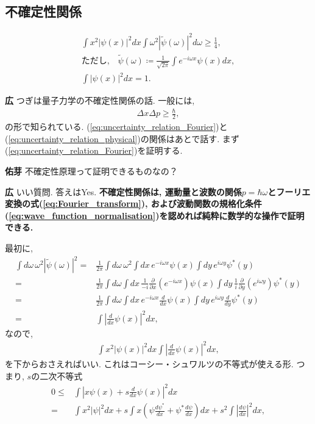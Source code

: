 \documentclass{ltjsarticle}
\theoremstyle{definition}
\newcommand{\parno}{\par\noindent}
\begin{document}
\subsection{不確定性関係}
\begin{tcolorbox}
  \begin{gather}
    \int x^2|\psi(x)|^2dx\int\omega^2|\tilde\psi(\omega)|^2d\omega\ge\frac14,\label{eq:uncertainty_relation_Fourier}\\
    \text{ただし,}\quad\tilde\psi(\omega)\coloneqq\frac1{\sqrt{2\pi}}\int e^{-i\omega x}\psi(x)dx,\label{eq:Fourier_transform}\\
    \int|\psi(x)|^2dx=1.\label{eq:wave_function_normalisation}
  \end{gather}
\end{tcolorbox}
\parno
\textbf{広} つぎは量子力学の不確定性関係の話. 一般には,
\begin{align}
  \Delta x\Delta p\ge\frac\hbar 2,\label{eq:uncertainty_relation_physical}
\end{align}
の形で知られている. (\ref{eq:uncertainty_relation_Fourier})と(\ref{eq:uncertainty_relation_physical})の関係はあとで話す. まず(\ref{eq:uncertainty_relation_Fourier})を証明する.
\parno
\textbf{佑芽} 不確定性原理って証明できるものなの？
\parno
\textbf{広} いい質問. 答えはYes. \textbf{不確定性関係は, 運動量と波数の関係$p=\hbar\omega$とフーリエ変換の式(\ref{eq:Fourier_transform}), および波動関数の規格化条件(\ref{eq:wave_function_normalisation})を認めれば純粋に数学的な操作で証明できる.}
\par
最初に,
\begin{align}
  \int d\omega\,\omega^2|\tilde\psi(\omega)|^2
  =&\frac1{2\pi}\int d\omega\,\omega^2\int dx\,e^{-i\omega x}\psi(x)\int dy\,e^{i\omega y}\psi^*(y)\\
  =&\frac1{2\pi}\int d\omega\int dx\,\frac1{-i}\frac\partial{\partial x}\left(e^{-i\omega x}\right)\psi(x)\int dy\,\frac1i\frac\partial{\partial y}\left(e^{i\omega y}\right)\psi^*(y)\\
  =&\frac1{2\pi}\int d\omega\int dx\,e^{-i\omega x}\frac d{dx}\psi(x)\int dy\,e^{i\omega y}\frac d{dy}\psi^*(y)\\
  =&\int\left|\frac d{dx}\psi(x)\right|^2dx,
\end{align}
なので,
\begin{align}
  \int x^2|\psi(x)|^2dx\int\left|\frac d{dx}\psi(x)\right|^2dx,
\end{align}
を下からおさえればいい. これはコーシー・シュワルツの不等式が使える形. つまり, $s$の二次不等式
\begin{align}
  0\le&\int\left|x\psi(x)+s\frac d{dx}\psi(x)\right|^2dx\\
  =&\int x^2|\psi|^2dx+s\int x\left(\psi\frac{d\psi^*}{dx}+\psi^*\frac{d\psi}{dx}\right)dx+s^2\int\left|\frac{d\psi}{dx}\right|^2dx,
\end{align}
\end{document}

